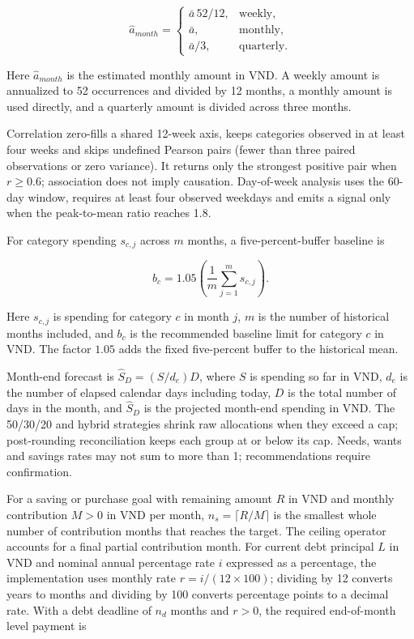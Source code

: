 \begin{equation}
  \widehat a_{month}=\begin{cases}
    \bar a\,52/12, & \text{weekly},\\
    \bar a, & \text{monthly},\\
    \bar a/3, & \text{quarterly}.
  \end{cases}
\end{equation}

Here $\widehat a_{month}$ is the estimated monthly amount in VND. A weekly amount is annualized to 52 occurrences and divided by 12 months, a monthly amount is used directly, and a quarterly amount is divided across three months.

Correlation zero-fills a shared 12-week axis, keeps categories observed in at least four weeks and skips undefined Pearson pairs (fewer than three paired observations or zero variance). It returns only the strongest positive pair when $r\geq0.6$; association does not imply causation. Day-of-week analysis uses the 60-day window, requires at least four observed weekdays and emits a signal only when the peak-to-mean ratio reaches 1.8.

For category spending $s_{c,j}$ across $m$ months, a five-percent-buffer baseline is

\begin{equation}
  b_c=1.05\left(\frac{1}{m}\sum_{j=1}^{m}s_{c,j}\right).
\end{equation}

Here $s_{c,j}$ is spending for category $c$ in month $j$, $m$ is the number of historical months included, and $b_c$ is the recommended baseline limit for category $c$ in VND. The factor $1.05$ adds the fixed five-percent buffer to the historical mean.

Month-end forecast is $\widehat S_D=(S/d_e)D$, where $S$ is spending so far in VND, $d_e$ is the number of elapsed calendar days including today, $D$ is the total number of days in the month, and $\widehat S_D$ is the projected month-end spending in VND. The 50/30/20 and hybrid strategies shrink raw allocations when they exceed a cap; post-rounding reconciliation keeps each group at or below its cap. Needs, wants and savings rates may not sum to more than 1; recommendations require confirmation.

For a saving or purchase goal with remaining amount $R$ in VND and monthly contribution $M>0$ in VND per month, $n_s=\lceil R/M\rceil$ is the smallest whole number of contribution months that reaches the target. The ceiling operator accounts for a final partial contribution month. For current debt principal $L$ in VND and nominal annual percentage rate $i$ expressed as a percentage, the implementation uses monthly rate $r=i/(12\times100)$; dividing by 12 converts years to months and dividing by 100 converts percentage points to a decimal rate. With a debt deadline of $n_d$ months and $r>0$, the required end-of-month level payment is

